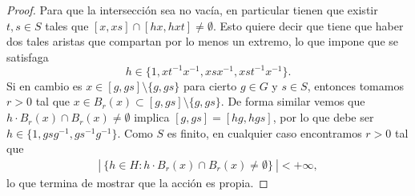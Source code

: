 \documentclass[11pt]{article}
\theoremstyle{colored}
\begin{document}
\begin{proof}
Para que la intersección sea no vacía, en particular tienen que existir $t,s \in S$ tales que $[x,xs] \cap [hx,hxt] \neq \emptyset$. Esto quiere decir que tiene que haber dos tales aristas que compartan por lo menos un extremo, lo que impone que se satisfaga
\[
h \in \{1,xt^{-1}x^{-1},xsx^{-1},xst^{-1}x^{-1}\}.
\]
Si en cambio es $x \in [g,gs] \setminus \{g,gs\}$ para cierto $g \in G$ y $s \in S$, entonces tomamos $r > 0$ tal que $x \in B_r(x) \subset [g,gs] \setminus \{g,gs\}$. De forma similar vemos que $h \cdot B_r(x) \cap B_r(x) \neq \emptyset$ implica $[g,gs] = [hg,hgs]$, por lo que debe ser $h \in \{1,gsg^{-1},gs^{-1}g^{-1}\}$. Como $S$ es finito, en cualquier caso encontramos $r > 0$ tal que 
\begin{align*}
| \ \{h \in H : h \cdot B_r(x) \cap B_r(x) \neq \emptyset \} \ | < +\infty,
\end{align*}
lo que termina de mostrar que la acción es propia.
\end{proof}
\end{document}
